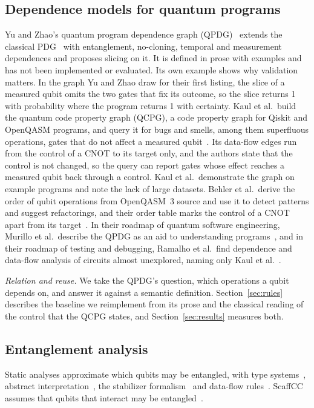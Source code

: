 \subsection{Dependence models for quantum programs}
Yu and Zhao's quantum program dependence graph (QPDG)~\cite{yu2025qpdg} extends the classical
PDG~\cite{ferrante1987pdg} with entanglement, no-cloning, temporal and measurement dependences and proposes slicing on
it. It is defined in prose with examples and has not been implemented or evaluated. Its own example shows why
validation matters. In the graph Yu and Zhao draw for their first listing, the slice of a measured qubit omits the two
gates that fix its outcome, so the slice returns 1 with probability \numYzFigSliceProb{} where the program returns 1
with certainty. Kaul et al.\ build the quantum code property graph (QCPG), a code property graph for Qiskit and
OpenQASM programs, and query it for bugs and smells, among them superfluous operations, gates that do not affect a
measured qubit~\cite{kaul2023uniform}. Its data-flow edges run from the control of a CNOT to its target only, and the
authors state that the control is not changed, so the query can report gates whose effect reaches a measured qubit
back through a control. Kaul et al.\ demonstrate the graph on example programs and note the lack of large datasets.
Behler et al.\ derive the order of qubit operations from OpenQASM~3 source and use it to detect patterns and suggest
refactorings, and their order table marks the control of a CNOT apart from its target~\cite{behler2024supporting,
behler2025static}. In their roadmap of quantum software engineering, Murillo et al.\ describe the QPDG as an aid to
understanding programs~\cite{murillo2025roadmap}, and in their roadmap of testing and debugging, Ramalho et al.\ find
dependence and data-flow analysis of circuits almost unexplored, naming only Kaul et al.~\cite{ramalho2025road}.

\emph{Relation and reuse.} We take the QPDG's question, which operations a qubit depends on, and answer it against a
semantic definition. Section~\ref{sec:rules} describes the baseline we reimplement from its prose and the classical
reading of the control that the QCPG states, and Section~\ref{sec:results} measures both.

\subsection{Entanglement analysis}
Static analyses approximate which qubits may be entangled, with type systems~\cite{perdrix2007types,
prost2009reasoning, yuan2022twist}, abstract interpretation~\cite{perdrix2008entanglement, yu2021abstract}, the
stabilizer formalism~\cite{honda2015stabilizer} and data-flow rules~\cite{xia2025entanglement}. ScaffCC assumes that
qubits that interact may be entangled~\cite{javadiabhari2015scaffcc}.

